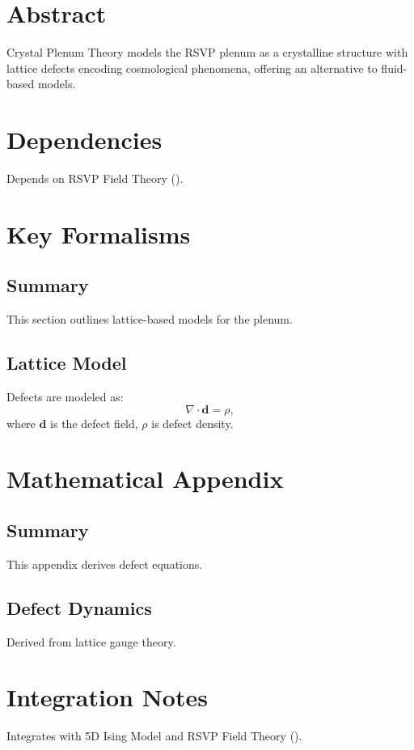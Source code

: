 \documentclass[11pt,oneside]{memoir}
\theoremstyle{plain}
\begin{document}
\section{Abstract}
Crystal Plenum Theory models the RSVP plenum as a crystalline structure with lattice defects encoding cosmological phenomena, offering an alternative to fluid-based models.

\section{Dependencies}
Depends on RSVP Field Theory ().

\section{Key Formalisms}
\subsection{Summary}
This section outlines lattice-based models for the plenum.

\subsection{Lattice Model}
Defects are modeled as:
\begin{equation}
    \nabla \cdot \mathbf{d} = \rho,
\end{equation}
where \(\mathbf{d}\) is the defect field, \(\rho\) is defect density.

\section{Mathematical Appendix}
\subsection{Summary}
This appendix derives defect equations.

\subsection{Defect Dynamics}
Derived from lattice gauge theory.

\section{Integration Notes}
Integrates with 5D Ising Model and RSVP Field Theory ().
\end{document}
